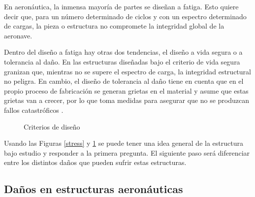 En aeronáutica, la inmensa mayoría de partes se diseñan a fatiga. Esto quiere decir que, para un número determinado de ciclos y con un espectro determinado de cargas, la pieza o estructura no compromete la integridad global de la aeronave.

Dentro del diseño a fatiga hay otras dos tendencias, el diseño a vida segura o a tolerancia al daño. En las estructuras diseñadas bajo el criterio de vida segura granizan que, mientras no se supere el espectro de carga, la integridad estructural no peligra. En cambio, el diseño de tolerancia al daño tiene en cuenta que en el propio proceso de fabricación se generan grietas en el material y asume que estas grietas van a crecer, por lo que toma medidas para asegurar que no se produzcan fallos catastróficos \cite{criterios}. 

\vspace*{10pt}
\begin{figure}[ht]
    \centering
    \caption{Criterios de diseño \cite{criterios}}
    \label{des_cri}
\end{figure}
\vspace*{10pt}

Usando las Figuras \ref{stress} y \ref{des_cri} se puede tener una idea general de la estructura bajo estudio y responder a la primera pregunta. El siguiente paso será diferenciar entre los distintos daños que pueden sufrir estas estructuras.


\subsection{Daños en estructuras aeronáuticas}


